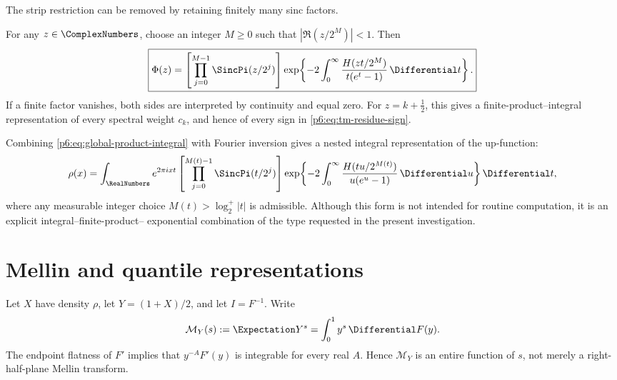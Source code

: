 \documentclass[11pt]{article}
\theoremstyle{definition}
\theoremstyle{remark}
\begin{document}
The strip restriction can be removed by retaining finitely many sinc factors.

\begin{corollary}
\label{p6:cor:global-hybrid}
For any \(z\in\ComplexNumbers\), choose an integer \(M\ge0\) such that
\(|\Re(z/2^M)|<1\).  Then
\begin{equation}
\boxed{
 \Phi(z)=
 \left[\prod_{j=0}^{M-1}\SincPi(z/2^j)\right]
 \exp\!\left\{-2\int_0^\infty
 \frac{H(zt/2^M)}{t(e^t-1)}\,\Differential t\right\}.}             \label{p6:eq:global-product-integral}
\end{equation}
If a finite factor vanishes, both sides are interpreted by continuity and equal zero.
For \(z=k+\tfrac12\), this gives a finite-product--integral representation of every
spectral weight \(c_k\), and hence of every sign in \eqref{p6:eq:tm-residue-sign}.
\end{corollary}

Combining \eqref{p6:eq:global-product-integral} with Fourier inversion gives a nested
integral representation of the up-function:
\begin{equation}
 \rho(x)=\int_{\RealNumbers}e^{2\pi ixt}
 \left[\prod_{j=0}^{M(t)-1}\SincPi(t/2^j)\right]
 \exp\!\left\{-2\int_0^\infty
 \frac{H(tu/2^{M(t)})}{u(e^u-1)}\,\Differential u\right\}\Differential t,     \label{p6:eq:rho-nested-malmsten}
\end{equation}
where any measurable integer choice \(M(t)>\log_2^+|t|\) is admissible.  Although this
form is not intended for routine computation, it is an explicit integral--finite-product--
exponential combination of the type requested in the present investigation.

\section{Mellin and quantile representations}
\label{p6:sec:mellin-quantile}

Let \(X\) have density \(\rho\), let \(Y=(1+X)/2\), and let
\(I=F^{-1}\).  Write
\begin{equation}
 \mathcal M_Y(s):=\Expectation Y^s=\int_0^1y^s\,\Differential F(y).             \label{p6:eq:MY-def}
\end{equation}
The endpoint flatness of \(F'\) implies that \(y^{-A}F'(y)\) is integrable for every
real \(A\).  Hence \(\mathcal M_Y\) is an entire function of \(s\), not merely a
right-half-plane Mellin transform.
\end{document}
